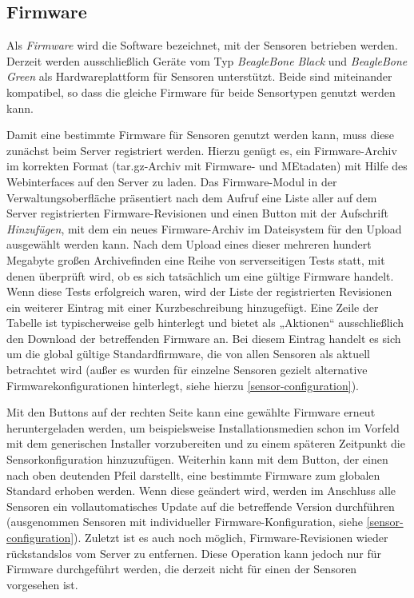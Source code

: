 \documentclass[12pt]{article}
\begin{document}
\subsection{Firmware} \label{firmware}
Als \textit{Firmware} wird die Software bezeichnet, mit der Sensoren betrieben werden. Derzeit werden ausschließlich Geräte vom Typ \textit{BeagleBone Black} und \textit{BeagleBone Green} als Hardwareplattform für Sensoren unterstützt. Beide sind miteinander kompatibel, so dass die gleiche Firmware für beide Sensortypen genutzt werden kann.

Damit eine bestimmte Firmware für Sensoren genutzt werden kann, muss diese zunächst beim Server registriert werden. Hierzu genügt es, ein Firmware-Archiv im korrekten Format (tar.gz-Archiv mit Firmware- und MEtadaten) mit Hilfe des Webinterfaces auf den Server zu laden. Das Firmware-Modul in der Verwaltungsoberfläche präsentiert nach dem Aufruf eine Liste aller auf dem Server registrierten Firmware-Revisionen und einen Button mit der Aufschrift \textit{Hinzufügen}, mit dem ein neues Firmware-Archiv im Dateisystem für den Upload ausgewählt werden kann. Nach dem Upload eines dieser mehreren hundert Megabyte großen Archivefinden eine Reihe von serverseitigen Tests statt, mit denen überprüft wird, ob es sich tatsächlich um eine gültige Firmware handelt. Wenn diese Tests erfolgreich waren, wird der Liste der registrierten Revisionen ein weiterer Eintrag mit einer Kurzbeschreibung hinzugefügt. Eine Zeile der Tabelle ist typischerweise gelb hinterlegt und bietet als „Aktionen“ ausschließlich den Download der betreffenden Firmware an. Bei diesem Eintrag handelt es sich um die global gültige Standardfirmware, die von allen Sensoren als aktuell betrachtet wird (außer es wurden für einzelne Sensoren gezielt alternative Firmwarekonfigurationen hinterlegt, siehe hierzu \ref{sensor-configuration}).

Mit den Buttons auf der rechten Seite kann eine gewählte Firmware erneut heruntergeladen werden, um beispielsweise Installationsmedien schon im Vorfeld mit dem generischen Installer vorzubereiten und zu einem späteren Zeitpunkt die Sensorkonfiguration hinzuzufügen. Weiterhin kann mit dem Button, der einen nach oben deutenden Pfeil darstellt, eine bestimmte Firmware zum globalen Standard erhoben werden. Wenn diese geändert wird, werden im Anschluss alle Sensoren ein vollautomatisches Update auf die betreffende Version durchführen (ausgenommen Sensoren mit individueller Firmware-Konfiguration, siehe \ref{sensor-configuration}). Zuletzt ist es auch noch möglich, Firmware-Revisionen wieder rückstandslos vom Server zu entfernen. Diese Operation kann jedoch nur für Firmware durchgeführt werden, die derzeit nicht für einen der Sensoren vorgesehen ist.
\end{document}
